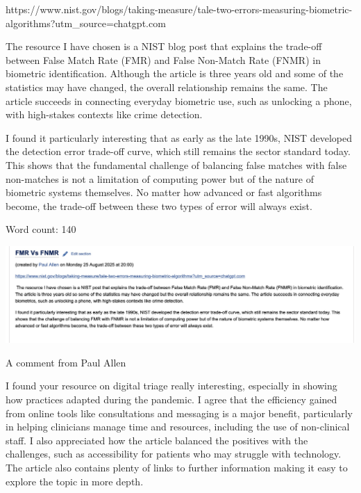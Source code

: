 \documentclass{tufte-handout}
\begin{document}
\begin{question}
    \qpart
    \qsubpart

https://www.nist.gov/blogs/taking-measure/tale-two-errors-measuring-biometric-algorithms?utm_source=chatgpt.com

    The resource I have chosen is a NIST blog post that explains the trade-off between 
    False Match Rate (FMR) and False Non-Match Rate (FNMR) in biometric identification. 
    Although the article is three years old and some of the statistics may have changed, 
    the overall relationship remains the same. The article succeeds in connecting everyday 
    biometric use, such as unlocking a phone, with high-stakes contexts like crime 
    detection.
    
I found it particularly interesting that as early as the late 1990s, NIST developed 
the detection error trade-off curve, which still remains the sector standard today. 
This shows that the fundamental challenge of balancing false matches with false 
non-matches is not a limitation of computing power but of the nature of biometric 
systems themselves. No matter how advanced or fast algorithms become, the trade-off 
between these two types of error will always exist.

Word count: 140

    \qsubpart

\includegraphics[scale=0.4]{Wiki.jpg}

    \subqpart

    A comment from Paul Allen

I found your resource on digital triage really interesting, especially in showing how 
practices adapted during the pandemic. I agree that the efficiency gained from online tools 
like consultations and messaging is a major benefit, particularly in helping clinicians manage 
time and resources, including the use of non-clinical staff. I also appreciated how the article 
balanced the positives with the challenges, such as accessibility for patients who may struggle
with technology. The article also contains plenty of links to further information making it easy 
to explore the topic in more depth.


\end{question}
\end{document}
